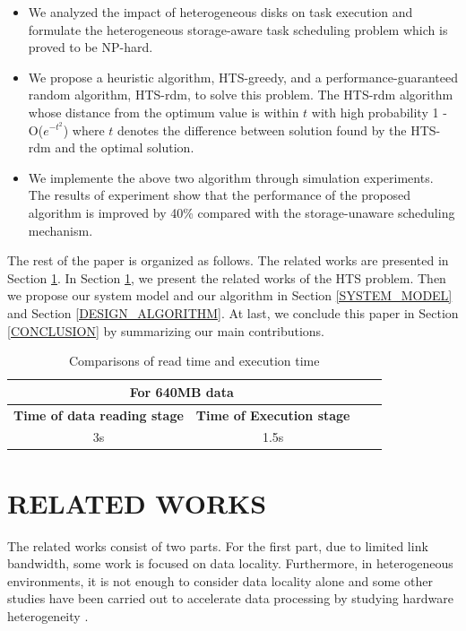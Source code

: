 \documentclass[conference]{IEEEtran}
\begin{document}
\begin{itemize}
\item We analyzed the impact of heterogeneous disks on task execution and formulate the heterogeneous storage-aware task scheduling problem which is proved to be NP-hard. 
\item We propose a heuristic algorithm, HTS-greedy, and a performance-guaranteed random algorithm, HTS-rdm, to solve this problem. The HTS-rdm algorithm whose distance from the optimum value is within $t$ with high probability 1 - O($e^{-t^2}$) where $t$ denotes the difference between solution found by the HTS-rdm and the optimal solution.
\item We implemente the above two algorithm through simulation experiments. The results of experiment show that the performance of the proposed algorithm is improved by 40\% compared with the storage-unaware scheduling mechanism.
\end{itemize}

The rest of the paper is organized as follows. The related works are presented in Section \ref{RELATED_WORKS}. In Section \ref{RELATED_WORKS}, we present the related works of the HTS problem. Then we propose our system model and our algorithm in Section  \ref{SYSTEM_MODEL} and Section  \ref{DESIGN_ALGORITHM}. At last, we conclude this paper in Section \ref{CONCLUSION} by summarizing our main contributions.

\begin{table}[htbp]
	\caption{Comparisons of read time and execution time}
	\begin{center}
		\begin{tabular}{|c|c|c|c|}
			\hline
			\multicolumn{2}{|c|}{\textbf{For 640MB data}} \\
			\hline
			\textbf{Time of data reading stage}& \textbf{Time of  Execution stage}\\
			\hline
			3s & 1.5s  \\
			\hline
		\end{tabular}
		\label{tab1}
	\end{center}
\end{table}

\section{RELATED WORKS}\label{RELATED_WORKS}
The related works consist of two parts. For the first part, due to limited link bandwidth, some work is focused on data locality. Furthermore, in heterogeneous environments, it is not enough to consider data locality alone and some other studies have been carried out to accelerate data processing by studying hardware heterogeneity \cite{b1}.
\end{document}
